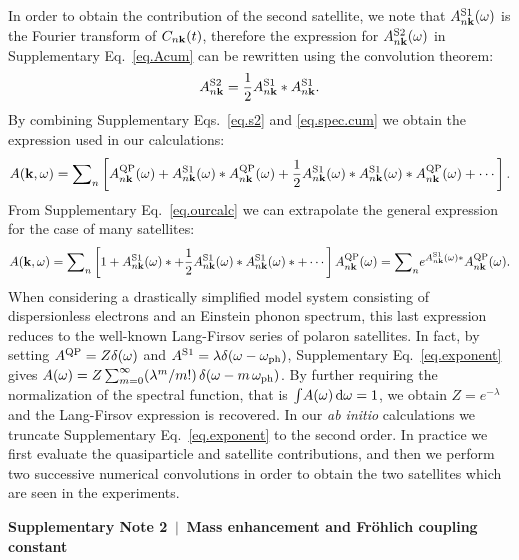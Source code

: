 \documentclass[12pt]{nature-mod}
\def\bk{{\bf k}}
\begin{document}
In order to obtain the contribution of the second satellite, we note that $A_{n\bk}^{\rm S1}(\omega)$
is the Fourier transform of $C_{n\bk}(t)$, therefore the expression for $A_{n\bk}^{\rm S2}(\omega)$
in Supplementary Eq.~\eqref{eq.Acum} can be rewritten using the convolution theorem:
  \begin{equation} \label{eq.s2}
  A_{n\bk}^{\rm S2} = \frac{1}{2} A_{n\bk}^{\rm S1} \ast A_{n\bk}^{\rm S1}.
  \end{equation}
By combining Supplementary Eqs.~\eqref{eq.s2} and \eqref{eq.spec.cum}
we obtain the expression used in our calculations:
  \begin{equation} \label{eq.ourcalc}
  A(\bk,\omega)={\sum}_n \left[ A_{n\bk}^{\rm{QP}}(\omega)+ A_{n\bk}^{\rm S1}(\omega) 
  \ast A_{n\bk}^{\rm{QP}}(\omega) + \frac{1}{2} A_{n\bk}^{\rm S1}(\omega) \ast  
  A_{n\bk}^{\rm S1}(\omega) \ast A_{n\bk}^{\rm QP}(\omega) +\cdots\right].
  \end{equation}
From Supplementary Eq.~\eqref{eq.ourcalc} we can extrapolate the general expression for 
the case of many satellites:
  \begin{equation}\label{eq.exponent}
  A(\bk,\omega)={\sum}_n \left[ 1+
  A_{n\bk}^{\rm S1}(\omega) \ast 
  + \frac{1}{2} A_{n\bk}^{\rm S1}(\omega) \ast  A_{n\bk}^{\rm S1}(\omega) \ast + \cdots \right]
  A_{n\bk}^{\rm{QP}}(\omega)  = {\sum}_n \displaystyle e^{A_{n\bk}^{\rm S1}(\omega) \ast }
  A_{n\bk}^{\rm{QP}}(\omega).
  \end{equation}
When considering a drastically simplified model system consisting of dispersionless electrons
and an Einstein phonon spectrum, this last expression reduces to the well-known Lang-Firsov 
series of polaron satellites\cite{Langreth1970,Berciu2006}.
In fact, by setting $A^{\rm QP} = Z\delta(\omega)$ and $A^{\rm S1} =
\lambda\delta(\omega-\omega_{\rm ph})$, Supplementary Eq.~\eqref{eq.exponent} gives
$A(\omega) = Z \sum_{m=0}^\infty (\lambda^m/m!) \,\delta(\omega-m\,\omega_{\rm ph})$.
By further requiring the normalization of the spectral function, that is 
$\int\!A(\omega)\,{\rm d}\omega=1$, we obtain $Z=e^{-\lambda}$ and the Lang-Firsov 
expression is recovered.
In our {\it ab initio} calculations we truncate Supplementary Eq.~\eqref{eq.exponent} to 
the second order. In practice we first evaluate the quasiparticle and satellite contributions, and 
then we perform two successive numerical convolutions in order to obtain the two satellites which are 
seen in the experiments.

\vspace{0.5cm}
\textbf{Supplementary Note 2 $\,\bm|\,$ Mass enhancement and Fr\"ohlich coupling constant}
\end{document}
